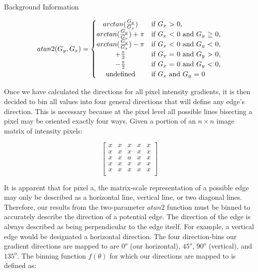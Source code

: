 \documentclass[a4paper,12pt]{article}
\begin{document}
\begin{section}{Background Information}
\singlespacing
\begin{center}
\[
atan2(G_y, G_x) = \left\{\def\arraystretch{1.2}%
  \begin{array}{@{}c@{\quad}l@{}}
	arctan(\frac{G_y}{G_x}) & \text{if $G_x$ $>$ 0,}\\
	arctan(\frac{G_y}{G_x}) + \pi & \text{if $G_x$ $<$ 0 and $G_y$ $\geq$ 0,}\\  
	arctan(\frac{G_y}{G_x}) - \pi & \text{if $G_x$ $<$ 0 and $G_y$ $<$ 0,}\\
	+\frac{\pi}{2} & \text{if $G_x$ = 0 and $G_y$ $>$ 0,}\\
	-\frac{\pi}{2} & \text{if $G_x$ = 0 and $G_y$ $<$ 0,}\\
	\text{undefined} & \text{if $G_x$ and $G_y$ = 0}\\
  \end{array}\right.
\]
\end{center}
\doublespacing

Once we have calculated the directions for all pixel intensity gradients, it is then decided to bin all values into four general directions that will define any edge's direction.
This is necessary because at the pixel level all possible lines bisecting a pixel may be oriented exactly four ways.
Given a portion of an $n\times n$ image matrix of intensity pixels:

\singlespacing
\begin{center}
\[
\begin{bmatrix}
x & x & x & x & x\\
x & x & x & x & x\\
x & x & a & x & x\\
x & x & x & x & x\\
x & x & x & x & x\\	
\end{bmatrix}
\]
\end{center}
\doublespacing

It is apparent that for pixel a, the matrix-scale representation of a possible edge may only be described as a horizontal line, vertical line, or two diagonal lines.
Therefore, our results from the two-parameter $atan2$ function must be binned to accurately describe the direction of a potential edge.
The direction of the edge is always described as being perpendicular to the edge itself. For example, a vertical edge would be designated a horizontal direction.
The four direction-bins our gradient directions are mapped to are $0^o$ (our horizontal), $45^o$, $90^o$ (vertical), and $135^o$.
The binning function $f(\theta)$ for which our directions are mapped to is defined as:


\end{section}
\end{document}
